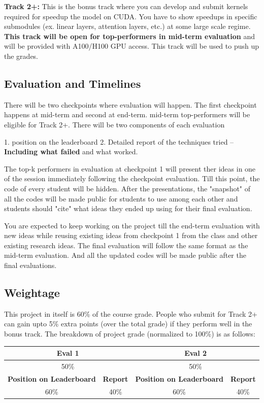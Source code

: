 \documentclass[11pt]{article}
\begin{document}
\textbf{Track 2+:} This is the bonus track where you can develop and submit kernels required for speedup the model on CUDA. You have to show speedups in specific submodules (ex. linear layers, attention layers, etc.) at some large scale regime. \textbf{This track will be open for top-performers in mid-term evaluation} and will be provided with A100/H100 GPU access. This track will be used to push up the grades.

\subsection{Evaluation and Timelines}
There will be two checkpoints where evaluation will happen. The first checkpoint happens at mid-term and second at end-term.  mid-term top-performers will be eligible for Track 2+. There will be two components of each evaluation

1. position on the leaderboard
2. Detailed report of the techniques tried -- \textbf{Including what failed} and what worked. 

The top-k performers in evaluation at checkpoint 1 will present ther ideas in one of the session immediately following the checkpoint evaluation. Till this point, the code of every student will be hidden. After the presentations, the "snapshot" of all the codes will be made public for students to use among each other and students should "cite" what ideas they ended up using for their final evaluation. 

You are expected to keep working on the project till the end-term evaluation with new ideas while reusing existing ideas from checkpoint 1 from the class and other existing research ideas. The final evaluation will follow the same format as the mid-term evaluation. And all the updated codes will be made public after the final evaluations. 


\subsection{Weightage}
This project in itself is 60\% of the course grade. People who submit for Track 2+ can gain upto 5\% extra points (over the total grade) if they perform well in the bonus track. The breakdown of project grade (normalized to 100\%) is as follows:

\begin{center}
\begin{tabular}{|c|c|c|c|}
    \hline
    \multicolumn{2}{|c|}{\textbf{Eval 1}} & \multicolumn{2}{|c|}{\textbf{Eval 2}} \\
    \hline
    \multicolumn{2}{|c|}{50\%} & \multicolumn{2}{|c|}{50\%} \\
    \hline
    \textbf{Position on Leaderboard} & \textbf{Report} & \textbf{Position on Leaderboard} & \textbf{Report} \\
    \hline
    60\% & 40\% & 60\% & 40\% \\
    \hline
\end{tabular}
\end{center}
\end{document}
